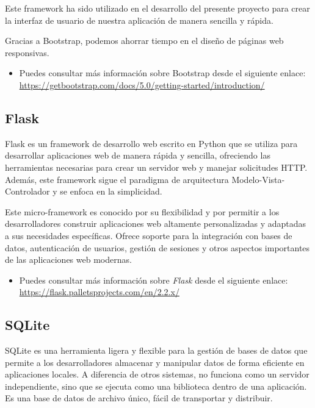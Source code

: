 Este framework ha sido utilizado en el desarrollo del presente proyecto para crear la interfaz de usuario de nuestra aplicación de manera sencilla y rápida.

Gracias a Bootstrap, podemos ahorrar tiempo en el diseño de páginas web responsivas.

\begin{itemize}
    \item Puedes consultar más información sobre Bootstrap desde el siguiente enlace: \url{https://getbootstrap.com/docs/5.0/getting-started/introduction/}
\end{itemize}

\subsection{Flask} \label{FLASK}
Flask es un framework de desarrollo web escrito en Python que se utiliza para desarrollar aplicaciones web de manera rápida y sencilla, ofreciendo las herramientas necesarias para crear un servidor web y manejar solicitudes HTTP. Además, este framework sigue el paradigma de arquitectura Modelo-Vista-Controlador y se enfoca en la simplicidad.

Este micro-framework es conocido por su flexibilidad y por permitir a los desarrolladores construir aplicaciones web altamente personalizadas y adaptadas a sus necesidades específicas. Ofrece soporte para la integración con bases de datos, autenticación de usuarios, gestión de sesiones y otros aspectos importantes de las aplicaciones web modernas.

\begin{itemize}
    \item Puedes consultar más información sobre \textit{Flask} desde el siguiente enlace: \url{https://flask.palletsprojects.com/en/2.2.x/}
\end{itemize}

\subsection{SQLite} \label{SQLite}

SQLite es una herramienta ligera y flexible para la gestión de bases de datos que permite a los desarrolladores almacenar y manipular datos de forma eficiente en aplicaciones locales. A diferencia de otros sistemas, no funciona como un servidor independiente, sino que se ejecuta como una biblioteca dentro de una aplicación. Es una base de datos de archivo único, fácil de transportar y distribuir.

